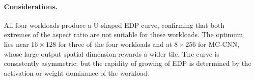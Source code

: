 \paragraph{Considerations.}
All four workloads produce a U-shaped EDP curve, confirming that both
extremes of the aspect ratio are not suitable for these workloads.
The optimum lies near $16 \times 128$ for three of the four workloads
and at $8 \times 256$ for MC-CNN, whose large output spatial dimension
rewards a wider tile.
The curve is consistently asymmetric: but the rapidity of growing of EDP is determined by the activation or weight dominance of the workload.